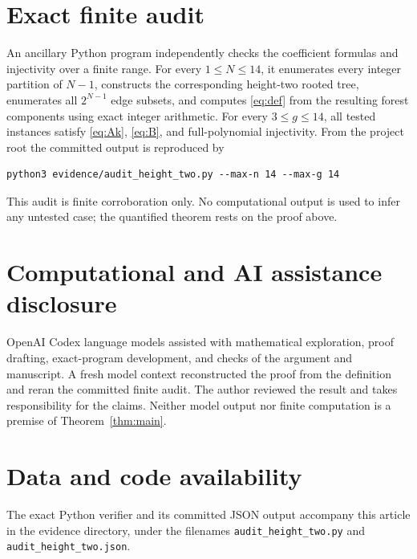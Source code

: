 \documentclass[11pt]{article}
\begin{document}
\section{Exact finite audit}

An ancillary Python program independently checks the coefficient formulas
and injectivity over a finite range.  For every $1\leq N\leq14$, it
enumerates every integer partition of $N-1$, constructs the corresponding
height-two rooted tree, enumerates all $2^{N-1}$ edge subsets, and computes
\eqref{eq:def} from the resulting forest components using exact integer
arithmetic.  For every $3\leq g\leq14$, all tested instances satisfy
\eqref{eq:Ak}, \eqref{eq:B}, and full-polynomial injectivity.  From the
project root the committed output is reproduced by
\begin{verbatim}
python3 evidence/audit_height_two.py --max-n 14 --max-g 14
\end{verbatim}
This audit is finite corroboration only.  No computational output is used
to infer any untested case; the quantified theorem rests on the proof
above.

\section*{Computational and AI assistance disclosure}

OpenAI Codex language models assisted with mathematical exploration,
proof drafting, exact-program development, and checks of the argument and
manuscript.  A fresh model context reconstructed the proof from the
definition and reran the committed finite audit.  The author reviewed the
result and takes responsibility for the claims.  Neither model output nor
finite computation is a premise of Theorem~\ref{thm:main}.

\section*{Data and code availability}

The exact Python verifier and its committed JSON output accompany this
article in the evidence directory, under the filenames
\texttt{audit\_height\_two.py} and \texttt{audit\_height\_two.json}.



\end{document}
